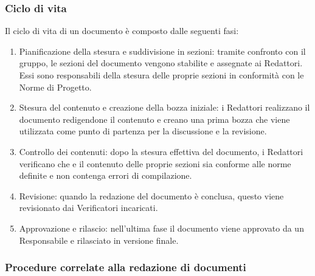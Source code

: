 \subsubsection{Ciclo di vita}
Il ciclo di vita di un documento è composto dalle seguenti fasi:
\begin{enumerate}
	\item Pianificazione della stesura e suddivisione in sezioni: tramite confronto con il gruppo, le sezioni del documento vengono stabilite e assegnate ai Redattori.
	      Essi sono responsabili della stesura delle proprie sezioni in conformità con le Norme di Progetto.
	\item Stesura del contenuto e creazione della bozza iniziale: i Redattori realizzano il documento redigendone il contenuto e creano una prima bozza
	      che viene utilizzata come punto di partenza per la discussione e la revisione.
	\item Controllo dei contenuti: dopo la stesura effettiva del documento, i Redattori verificano che e il contenuto delle proprie sezioni
	      sia conforme alle norme definite e non contenga errori di compilazione.
	\item Revisione: quando la redazione del documento è conclusa, questo viene revisionato dai Verificatori incaricati.
	\item Approvazione e rilascio: nell'ultima fase il documento viene approvato da un Responsabile e rilasciato in versione finale.
\end{enumerate}

\subsubsection{Procedure correlate alla redazione di documenti}

